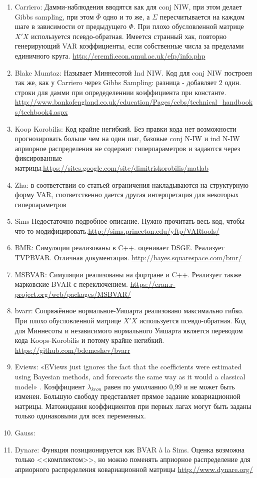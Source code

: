 \documentclass[11pt]{article} %
\newcommand{\post}{\overline}
\begin{document}
\begin{enumerate}
\item Carriero: Дамми-наблюдения вводятся как для conj NIW, при этом делает Gibbs sampling, при этом $\post\Phi$ одно и то же, а $\Sigma$ пересчитывается на каждом шаге в зависимости от предыдущего $\Phi$. При плохо обусловленной матрице $X'X$ используется псевдо-обратная. Имеется странный хак, повторно генерирующий VAR коэффициенты, если собственные числа за пределами единичного круга. \url{http://cremfi.econ.qmul.ac.uk/efp/info.php} 
\item Blake Mumtaz: Называет Миннесотой Ind NIW.  Код для conj NIW построен так же, как у Carriero через Gibbs Sampling: разница - добавляет 2 один. строки для дамми при опредеделеннии коэффициента при константе. \url{http://www.bankofengland.co.uk/education/Pages/ccbs/technical_handbooks/techbook4.aspx}
\item Koop Korobilis: Код крайне негибкий. Без правки кода нет возможности прогнозировать больше чем на один шаг, базовые conj N-IW и ind N-IW априорное распределения не содержит  гиперпараметров и задаются через фиксированные матрицы.\url{https://sites.google.com/site/dimitriskorobilis/matlab}\\
\item Zha: в соответствии со статьей ограничения накладываются на структурную форму VAR, соответственно дается другая интерпретация для некоторых гиперпараметров
\item Sims Недостаточно подробное описание. Нужно прочитать весь код, чтобы что-то модифицировать.\url{http://sims.princeton.edu/yftp/VARtools/}
\item BMR: Симуляции реализованы в C++.  оценивает DSGE.  Реализует TVPBVAR. Отличная документация. \url{ http://bayes.squarespace.com/bmr/} 
\item MSBVAR: Симуляции реализованы на фортране и C++. Реализует также марковские BVAR с переключением.  \url{https://cran.r-project.org/web/packages/MSBVAR/ }
\item bvarr: Сопряжённое нормальное-Уишарта реализовано максимально гибко.  При плохо обусловленной матрице $X'X$ используется псевдо-обратная. Код для Миннесоты и независимого нормального Уишарта является переводом кода Koops-Korobilis и потому крайне негибкий. \url{https://github.com/bdemeshev/bvarr }
\item Eviews: «EViews just ignores the fact that the coefficients were estimated using Bayesian methods, and forecasts the same way as it would a classical model» . Коэффициент $\lambda_{kron}$ равен по умолчанию 0,99 и не может быть изменен. Большую свободу представляет прямое задание ковариационной матрицы. Матожидания коэффициентов при первых лагах могут быть заданы только одинаковыми для всех переменных. 
\item Gauss: 
\item Dynare: Функция позиционируется как BVAR \`a la Sims. Оценка возможна только <<комплектом>>, но можно поменять априорное распределение для априорного распределения ковариационной матрицы  \url{http://www.dynare.org/}
\end{enumerate}


\listoftodos[Тудушки:]
\end{document}
